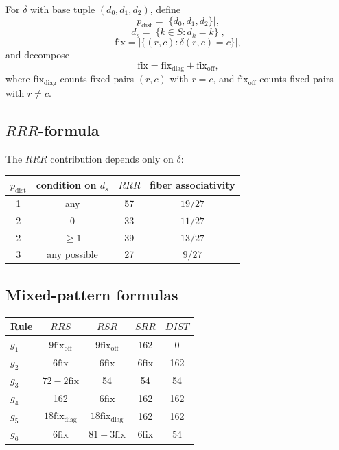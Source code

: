\documentclass[11pt]{article}
\begin{document}
For \(\delta\) with base tuple \((d_0,d_1,d_2)\), define
\[
p_{\mathrm{dist}}=|\{d_0,d_1,d_2\}|,
\]
\[
d_s=|\{k\in S:d_k=k\}|,
\]
\[
\mathrm{fix}=|\{(r,c):\delta(r,c)=c\}|,
\]
and decompose
\[
\mathrm{fix}=\mathrm{fix}_{\mathrm{diag}}+\mathrm{fix}_{\mathrm{off}},
\]
where \(\mathrm{fix}_{\mathrm{diag}}\) counts fixed pairs \((r,c)\) with \(r=c\),
and \(\mathrm{fix}_{\mathrm{off}}\) counts fixed pairs with \(r\ne c\).

\subsection[RRR-formula]{\(RRR\)-formula}

The \(RRR\) contribution depends only on \(\delta\):

\begin{center}
\small
\begin{tabular}{@{}cccc@{}}
\(p_{\mathrm{dist}}\) & condition on \(d_s\) & \(RRR\) & fiber associativity \\
\midrule
1 & any & 57 & \(19/27\) \\
2 & 0 & 33 & \(11/27\) \\
2 & \(\ge1\) & 39 & \(13/27\) \\
3 & any possible & 27 & \(9/27\) \\
\end{tabular}
\end{center}

\subsection{Mixed-pattern formulas}

\begin{center}
\small
\begin{tabular}{@{}lcccc@{}}
Rule & \(RRS\) & \(RSR\) & \(SRR\) & \(DIST\) \\
\midrule
\(g_1\) & \(9\mathrm{fix}_{\mathrm{off}}\) & \(9\mathrm{fix}_{\mathrm{off}}\) & 162 & 0 \\
\(g_2\) & \(6\mathrm{fix}\) & \(6\mathrm{fix}\) & \(6\mathrm{fix}\) & 162 \\
\(g_3\) & \(72-2\mathrm{fix}\) & 54 & 54 & 54 \\
\(g_4\) & 162 & \(6\mathrm{fix}\) & 162 & 162 \\
\(g_5\) & \(18\mathrm{fix}_{\mathrm{diag}}\) & \(18\mathrm{fix}_{\mathrm{diag}}\) & 162 & 162 \\
\(g_6\) & \(6\mathrm{fix}\) & \(81-3\mathrm{fix}\) & \(6\mathrm{fix}\) & 54 \\
\end{tabular}
\end{center}
\end{document}

